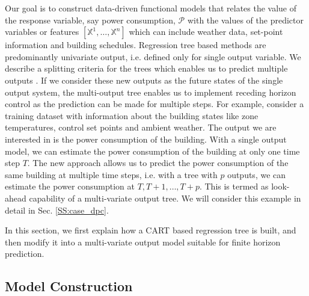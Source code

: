 Our goal is to construct data-driven functional models that relates the value of the response variable, say power consumption, $\mathcal{P}$ with the values of the predictor variables or features $[\mathbb{X}^1,\dots, \mathbb{X}^n]$ which can include weather data, set-point information and building schedules.
Regression tree based methods are predominantly univariate output, i.e. defined only for single output variable. We describe a splitting criteria for the trees which enables us to predict multiple outputs \cite{StruyfDzeroski2005}. 
If we consider these new outputs as the future states of the single output system, the multi-output tree enables us to implement receding horizon control as the prediction can be made for multiple steps. For example, consider a training dataset with information about the building states like zone temperatures, control set points and ambient weather. The output we are interested in is the power consumption of the building. With a single output model, we can estimate the power consumption of the building at only one time step $T$. The new approach allows us to predict the power consumption of the same building at multiple time steps, i.e. with a tree with $p$ outputs, we can estimate the power consumption at $T, T+1,\dots,T+p$. This is termed as look-ahead capability of a multi-variate output tree. We will consider this example in detail in Sec. \ref{SS:case_dpc}.

In this section, we first explain how a CART based regression tree is built, and then modify it into a multi-variate output model suitable for finite horizon prediction.

\subsection{Model Construction}
\label{SS:training_algo}

